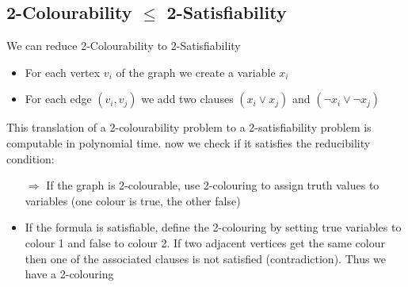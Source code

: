 \documentclass{article}[18pt]
\begin{document}
\subsection{2-Colourability $\leqslant$ 2-Satisfiability}
We can reduce 2-Colourability to 2-Satisfiability
\begin{itemize}
	\item For each vertex $v_i$ of the graph we create a variable $x_i$
	\item For each edge $(v_i,v_j)$ we add two clauses $(x_i\lor x_j)$ and $(\lnot x_i \lor \lnot x_j)$
\end{itemize}
This translation of a 2-colourability problem to a 2-satisfiability problem is computable in polynomial time. now we check if it satisfies the reducibility condition:
\begin{itemize}
	\item [$\Rightarrow$] If the graph is 2-colourable, use 2-colouring to assign truth values to variables (one colour is true, the other false)
	\item If the formula is satisfiable, define the 2-colouring by setting true variables to colour 1 and false to colour 2. If two adjacent vertices get the same colour then one of the associated clauses is not satisfied (contradiction). Thus we have a 2-colouring
\end{itemize}
\end{document}
